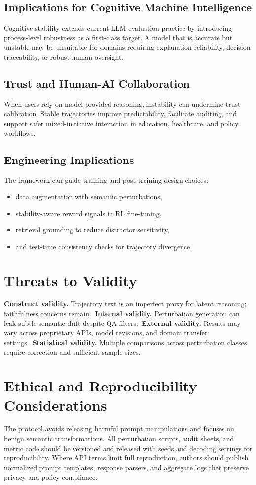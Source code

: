 \documentclass[conference]{IEEEtran}
\begin{document}
\subsection{Implications for Cognitive Machine Intelligence}
Cognitive stability extends current LLM evaluation practice by introducing process-level robustness as a first-class target. A model that is accurate but unstable may be unsuitable for domains requiring explanation reliability, decision traceability, or robust human oversight.

\subsection{Trust and Human-AI Collaboration}
When users rely on model-provided reasoning, instability can undermine trust calibration. Stable trajectories improve predictability, facilitate auditing, and support safer mixed-initiative interaction in education, healthcare, and policy workflows.

\subsection{Engineering Implications}
The framework can guide training and post-training design choices:
\begin{itemize}[leftmargin=*]
\item data augmentation with semantic perturbations,
\item stability-aware reward signals in RL fine-tuning,
\item retrieval grounding to reduce distractor sensitivity,
\item and test-time consistency checks for trajectory divergence.
\end{itemize}

\section{Threats to Validity}
\textbf{Construct validity.} Trajectory text is an imperfect proxy for latent reasoning; faithfulness concerns remain.\
\textbf{Internal validity.} Perturbation generation can leak subtle semantic drift despite QA filters.\
\textbf{External validity.} Results may vary across proprietary APIs, model revisions, and domain transfer settings.\
\textbf{Statistical validity.} Multiple comparisons across perturbation classes require correction and sufficient sample sizes.

\section{Ethical and Reproducibility Considerations}
The protocol avoids releasing harmful prompt manipulations and focuses on benign semantic transformations. All perturbation scripts, audit sheets, and metric code should be versioned and released with seeds and decoding settings for reproducibility. Where API terms limit full reproduction, authors should publish normalized prompt templates, response parsers, and aggregate logs that preserve privacy and policy compliance.
\end{document}
